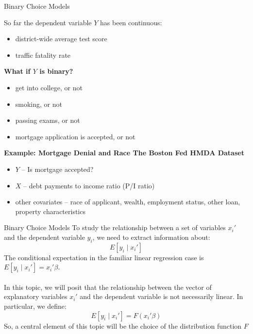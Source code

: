 \documentclass[notes,10pt, aspectratio=169]{beamer}
\begin{document}
\begin{frame}{Binary Choice Models}

So far the dependent variable $Y$ has been continuous:
\begin{itemize}
    \item district-wide average test score
    \item traffic fatality rate
\end{itemize}
\vspace{1em}
\begin{center}
    {\color{purple}\textbf{What if $Y$ is binary?}}
\end{center}
\begin{itemize}
    \item get into college, or not
    \item smoking, or not
    \item passing exams, or not
    \item mortgage application is accepted, or not
\end{itemize}
\vspace{1em}
\textbf{Example: Mortgage Denial and Race The Boston Fed HMDA Dataset}
\begin{itemize}
    \item $Y$ -- Is mortgage accepted?
    \item $X$ -- debt payments to income ratio (P/I ratio)
    \item other covariates -- race of applicant, wealth, employment status, other loan, property characteristics

\end{itemize}

\end{frame}


\begin{frame}{Binary Choice Models}
To study the relationship between a set of variables $x_i'$ and the dependent variable $y_i$, we need to extract information about:
\[
E[y_i \mid x_i']
\]
The conditional expectation in the familiar linear regression case is $E[y_i \mid x_i']=x_i'\beta$. \\~\\
In this topic, we will posit that the relationship between the vector of explanatory variables $x_i'$ and the dependent variable is not necessarily linear. In particular, we define:
\[
E[y_i \mid x_i']=F(x_i'\beta)
\]
So, a central element of this topic will be the choice of the distribution function $F$
\end{frame}
\end{document}

